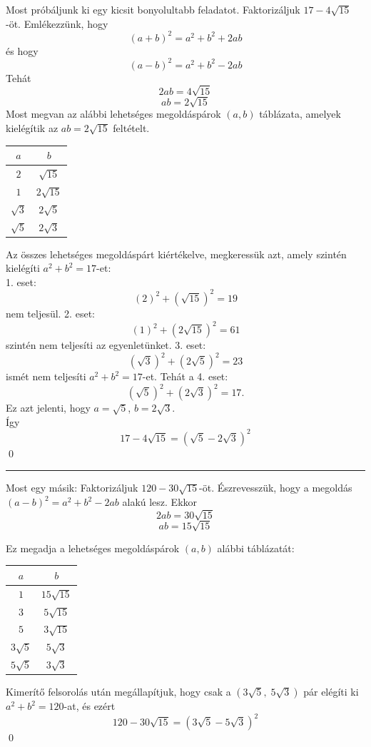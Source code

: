 \documentclass{article}
\begin{document}
Most próbáljunk ki egy kicsit bonyolultabb feladatot.
Faktorizáljuk $17-4\sqrt{15}$-öt.
Emlékezzünk, hogy
\[
    (a + b)^2 = a^2 + b^2 + 2ab
\]
és hogy
\[
    (a - b)^2 = a^2 + b^2 - 2ab
\]
Tehát
\[
    2ab = 4\sqrt{15}
\]
\[
    ab = 2\sqrt{15}
\]
Most megvan az alábbi lehetséges megoldáspárok $(a, b)$ táblázata, amelyek kielégítik az $ab = 2\sqrt{15}$ feltételt.
\begin{center}
    \begin{tabular}{c|c}
        $a$ & $b$ \\
        \hline
        \rule{0pt}{3ex} 
        $2$ & $\sqrt{15}$ \\ 
        $1$ & $2\sqrt{15}$ \\ 
        $\sqrt{3}$ & $2\sqrt{5}$ \\ 
        $\sqrt{5}$ & $2\sqrt{3}$ \\ 
    \end{tabular}
\end{center}
Az összes lehetséges megoldáspárt kiértékelve, megkeressük azt, amely szintén kielégíti $a^2 + b^2 = 17$-et:\\
1. eset:
\[
    (2)^2 + (\sqrt{15})^2 = 19
\]
nem teljesül. 2. eset:
\[
    (1)^2 + (2\sqrt{15})^2 = 61
\]
szintén nem teljesíti az egyenletünket. 3. eset:
\[
    (\sqrt{3})^2 + (2\sqrt{5})^2 = 23
\]
ismét nem teljesíti $a^2 + b^2 = 17$-et. Tehát a 4. eset:
\[
    (\sqrt{5})^2 + (2\sqrt{3})^2 = 17.
\]
Ez azt jelenti, hogy $a = \sqrt{5}$, $b = 2\sqrt{3}$.\\
Így
\[
    17-4\sqrt{15} = (\sqrt{5} - 2\sqrt{3})^2
\] \qed

\vspace{10pt}
\hrule
\vspace{10pt}

Most egy másik: Faktorizáljuk $120 - 30\sqrt{15}$-öt.
Észrevesszük, hogy a megoldás $(a - b)^2 = a^2 + b^2 - 2ab$ alakú lesz. Ekkor
\[
    2ab = 30\sqrt{15}
\]
\[
    ab = 15\sqrt{15}
\]

Ez megadja a lehetséges megoldáspárok $(a, b)$ alábbi táblázatát:
\begin{center}
    \begin{tabular}{c|c}
        $a$ & $b$ \\
        \hline
        \rule{0pt}{3ex} 
        $1$ & $15\sqrt{15}$ \\ 
        $3$ & $5\sqrt{15}$ \\ 
        $5$ & $3\sqrt{15}$ \\ 
        $3\sqrt{5}$ & $5\sqrt{3}$ \\ 
        $5\sqrt{5}$ & $3\sqrt{3}$
    \end{tabular}
\end{center}
Kimerítő felsorolás után megállapítjuk, hogy csak a $(3\sqrt{5},\; 5\sqrt{3})$ pár elégíti ki $a^2 + b^2 = 120$-at, és ezért
\[
    120-30\sqrt{15} = (3\sqrt{5} - 5\sqrt{3})^2
\] \qed
\end{document}
